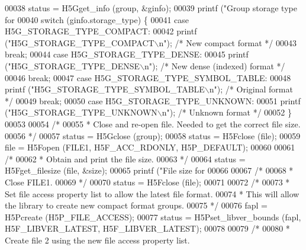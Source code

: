 \begin{DoxyCode}
00038     status = H5Gget\_info (group, &ginfo);
00039     printf (\textcolor{stringliteral}{"Group storage type for %
00040     \textcolor{keywordflow}{switch} (ginfo.storage\_type) \{
00041         \textcolor{keywordflow}{case} H5G\_STORAGE\_TYPE\_COMPACT:
00042             printf (\textcolor{stringliteral}{"H5G\_STORAGE\_TYPE\_COMPACT\(\backslash\)n"}); \textcolor{comment}{/* New compact format */}
00043             \textcolor{keywordflow}{break};
00044         \textcolor{keywordflow}{case} H5G\_STORAGE\_TYPE\_DENSE:
00045             printf (\textcolor{stringliteral}{"H5G\_STORAGE\_TYPE\_DENSE\(\backslash\)n"}); \textcolor{comment}{/* New dense (indexed) format */}
00046             \textcolor{keywordflow}{break};
00047         \textcolor{keywordflow}{case} H5G\_STORAGE\_TYPE\_SYMBOL\_TABLE:
00048             printf (\textcolor{stringliteral}{"H5G\_STORAGE\_TYPE\_SYMBOL\_TABLE\(\backslash\)n"}); \textcolor{comment}{/* Original format */}
00049             \textcolor{keywordflow}{break};
00050         \textcolor{keywordflow}{case} H5G\_STORAGE\_TYPE\_UNKNOWN:
00051             printf (\textcolor{stringliteral}{"H5G\_STORAGE\_TYPE\_UNKNOWN\(\backslash\)n"}); \textcolor{comment}{/* Unknown format */}
00052     \}
00053 
00054     \textcolor{comment}{/*}
00055 \textcolor{comment}{     * Close and re-open file.  Needed to get the correct file size.}
00056 \textcolor{comment}{     */}
00057     status = H5Gclose (group);
00058     status = H5Fclose (file);
00059     file = H5Fopen (FILE1, H5F\_ACC\_RDONLY, H5P\_DEFAULT);
00060 
00061     \textcolor{comment}{/*}
00062 \textcolor{comment}{     * Obtain and print the file size.}
00063 \textcolor{comment}{     */}
00064     status = H5Fget\_filesize (file, &size);
00065     printf (\textcolor{stringliteral}{"File size for %
00066 
00067     \textcolor{comment}{/*}
00068 \textcolor{comment}{     * Close FILE1.}
00069 \textcolor{comment}{     */}
00070     status = H5Fclose (file);
00071 
00072     \textcolor{comment}{/*}
00073 \textcolor{comment}{     * Set file access property list to allow the latest file format.}
00074 \textcolor{comment}{     * This will allow the library to create new compact format groups.}
00075 \textcolor{comment}{     */}
00076     fapl = H5Pcreate (H5P\_FILE\_ACCESS);
00077     status = H5Pset\_libver\_bounds (fapl, H5F\_LIBVER\_LATEST, H5F\_LIBVER\_LATEST);
00078 
00079     \textcolor{comment}{/*}
00080 \textcolor{comment}{     * Create file 2 using the new file access property list.}
}}
\end{DoxyCode}
